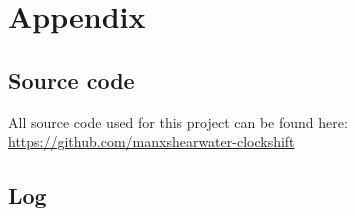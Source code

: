 \documentclass[a4paper]{article}
\begin{document}
\printbibliography


\section*{Appendix}

\subsection*{Source code}
All source code used for this project can be found here: \\
\url{https://github.com/manxshearwater-clockshift}

\newpage
{}
\subsection*{Log}
\end{document}
